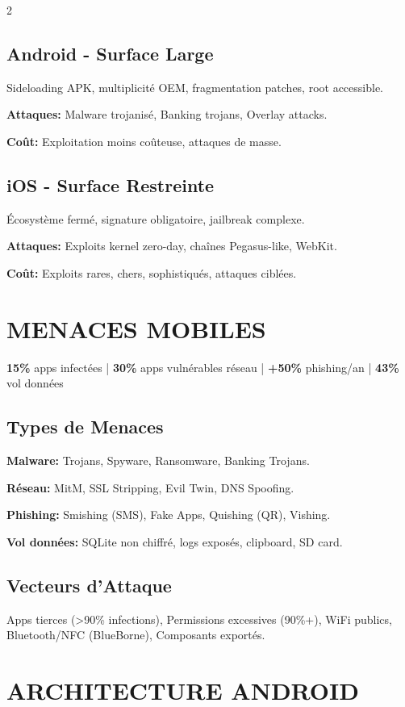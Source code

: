 \documentclass[9pt,a4paper]{extarticle}
\begin{document}
\begin{multicols}{2}
\subsection*{Android - Surface Large}
Sideloading APK, multiplicité OEM, fragmentation patches, root accessible.

\textbf{Attaques:} Malware trojanisé, Banking trojans, Overlay attacks.

\textbf{Coût:} Exploitation moins coûteuse, attaques de masse.

\subsection*{iOS - Surface Restreinte}
Écosystème fermé, signature obligatoire, jailbreak complexe.

\textbf{Attaques:} Exploits kernel zero-day, chaînes Pegasus-like, WebKit.

\textbf{Coût:} Exploits rares, chers, sophistiqués, attaques ciblées.

\section*{MENACES MOBILES}

\textbf{15\%} apps infectées | \textbf{30\%} apps vulnérables réseau | \textbf{+50\%} phishing/an | \textbf{43\%} vol données

\subsection*{Types de Menaces}
\textbf{Malware:} Trojans, Spyware, Ransomware, Banking Trojans.

\textbf{Réseau:} MitM, SSL Stripping, Evil Twin, DNS Spoofing.

\textbf{Phishing:} Smishing (SMS), Fake Apps, Quishing (QR), Vishing.

\textbf{Vol données:} SQLite non chiffré, logs exposés, clipboard, SD card.

\subsection*{Vecteurs d'Attaque}
Apps tierces (>90\% infections), Permissions excessives (90\%+), WiFi publics, Bluetooth/NFC (BlueBorne), Composants exportés.

\section*{ARCHITECTURE ANDROID}


\end{multicols}
\end{document}
